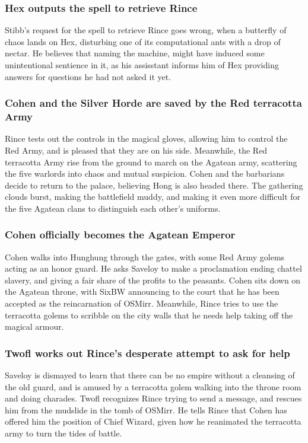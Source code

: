 \subsubsection{\Gls{Hex} outputs the spell to retrieve \Gls{Rince}}
\Gls{Stibb}'s request for the spell to retrieve \Gls{Rince} goes wrong, when a butterfly of chaos
lands on \Gls{Hex}, disturbing one of its computational ants with a drop of nectar. He believes that
naming the machine, might have induced some unintentional sentience in it, as his assisstant informs
him of \Gls{Hex} providing answers for questions he had not asked it yet.

\subsubsection{\Gls{Cohen} and the Silver Horde are saved by the Red terracotta Army}
\Gls{Rince} tests out the controls in the magical gloves, allowing him to control the Red Army, and
is pleased that they are on his side. Meanwhile, the Red terracotta Army rise from the ground to
march on the Agatean army, scattering the five warlords into chaos and mutual suspicion. \Gls{Cohen}
and the barbarians decide to return to the palace, believing \Gls{Hong} is also headed there. The
gathering clouds burst, making the battlefield muddy, and making it even more difficult for the
five Agatean clans to distinguish each other's uniforms.

\subsubsection{\Gls{Cohen} officially becomes the Agatean Emperor}
\Gls{Cohen} walks into Hunghung through the gates, with some Red Army golems acting as an honor
guard. He asks \Gls{Saveloy} to make a proclamation ending chattel slavery, and giving a fair share
of the profits to the peasants. \Gls{Cohen} sits down on the Agatean throne, with \Gls{SixBW}
announcing to the court that he has been accepted as the reincarnation of \Gls{OSMirr}. Meanwhile,
\Gls{Rince} tries to use the terracotta golems to scribble on the city walls that he needs help
taking off the magical armour.

\subsubsection{\Gls{Twofl} works out \Gls{Rince}'s desperate attempt to ask for help}
\Gls{Saveloy} is dismayed to learn that there can be no empire without a cleansing of the old guard,
and is amused by a terracotta golem walking into the throne room and doing charades. \Gls{Twofl}
recognizes \Gls{Rince} trying to send a message, and rescues him from the mudslide in the tomb of
\Gls{OSMirr}. He tells \Gls{Rince} that \Gls{Cohen} has offered him the position of Chief Wizard,
given how he reanimated the terracotta army to turn the tides of battle.

